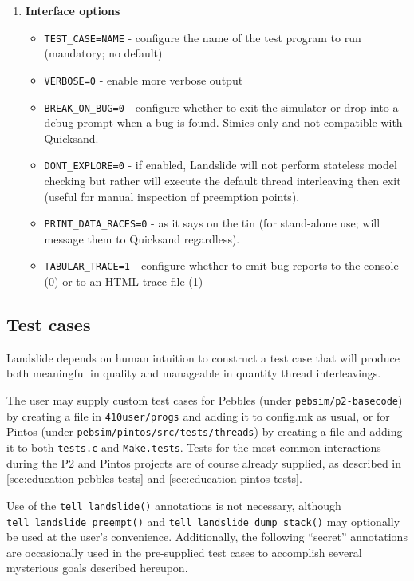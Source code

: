 \begin{enumerate}
\item {\bf Interface options}
\begin{itemize}
	\item {\tt TEST\_CASE=NAME} - configure the name of the test program to run (mandatory; no default)
	\item {\tt VERBOSE=0} - enable more verbose output
	\item {\tt BREAK\_ON\_BUG=0} - configure whether to exit the simulator or drop into a debug prompt when a bug is found. Simics only and not compatible with Quicksand.
	\item {\tt DONT\_EXPLORE=0} - if enabled, Landslide will not perform stateless model checking but rather will execute the default thread interleaving then exit (useful for manual inspection of preemption points).
	\item {\tt PRINT\_DATA\_RACES=0} - as it says on the tin (for stand-alone use; will message them to Quicksand regardless).
	\item {\tt TABULAR\_TRACE=1} - configure whether to emit bug reports to the console (0) or to an HTML trace file (1)
\end{itemize}
\end{enumerate}


\subsection{Test cases}
\label{sec:landslide-testcases}

Landslide depends on human intuition to construct a test case
that will produce both meaningful in quality and manageable in quantity thread interleavings.

The user may supply custom test cases
for Pebbles (under {\tt pebsim/p2-basecode})
by creating a file in {\tt 410user/progs} and adding it to config.mk as usual,
or for Pintos (under {\tt pebsim/pintos/src/tests/threads})
by creating a file and adding it to both {\tt tests.c} and {\tt Make.tests}.
Tests for the most common interactions during the P2 and Pintos projects are of course already supplied,
as described in \cref{sec:education-pebbles-tests} and \cref{sec:education-pintos-tests}.

Use of the {\tt tell\_landslide()} annotations
is not necessary,
although {\tt tell\_\allowbreak{}landslide\_preempt()} and {\tt tell\_landslide\_dump\_stack()}
may optionally be used at the user's convenience.
Additionally, the following ``secret'' annotations
are occasionally used in the pre-supplied test cases
to accomplish several mysterious goals described hereupon.

